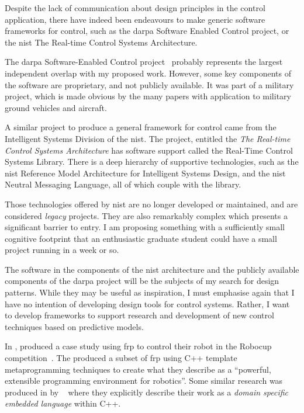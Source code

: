 Despite the lack of communication about design principles in the control
application, there have indeed been endeavours to make generic software
frameworks for control, such as the \ac{darpa} Software Enabled Control
project, or the \ac{nist}
The Real-time Control Systems Architecture.

The \ac{darpa} Software-Enabled Control project~\cite{Keviczky2004,Gill2003}
probably represents the largest independent overlap with my proposed work.
However, some key components of the software are proprietary, and not publicly
available. It was part of a military project, which is made obvious by the many
papers with application to military ground vehicles and aircraft.

A similar project to produce a general framework for control came from the
Intelligent Systems Division of the \ac{nist}. The project, entitled
the \emph{The Real-time Control Systems Architecture} has software support
called the Real-Time Control Systems Library. There is a deep hierarchy of
supportive technologies, such as the \ac{nist} Reference Model Architecture for
Intelligent Systems Design, and the \ac{nist} Neutral Messaging Language, all of
which couple with the library.

Those technologies offered by \ac{nist} are no longer developed or maintained,
and are considered \emph{legacy} projects. They are also remarkably complex
which presents a significant barrier to entry. I am proposing something with a
sufficiently small cognitive footprint that an enthusiastic graduate student
could have a small project running in a week or so.

The software in the components of the \ac{nist} architecture and the publicly
available components of the \ac{darpa} project will be the subjects of my search
for design patterns. While they may be useful as inspiration, I must emphasise
again that I have no intention of developing design tools for control systems.
Rather, I want to develop frameworks to support research and development of new
control techniques based on predictive models.

In \citeyear{Peterson2001a}, \citeauthor{Peterson2001a} produced a case study
using \ac{frp} to control their robot in the  Robocup
competition~\cite{Peterson2001a}. The produced a subset of \ac{frp} using C++
template metaprogramming techniques to create what they describe as a
``powerful, extensible programming environment for robotics''. Some similar
research was produced in \citeyear{Xiangtian2002} by
\citeauthor{Xiangtian2002}~\cite{Xiangtian2002} where they explicitly describe
their work as a \emph{domain specific embedded language} within C++.

